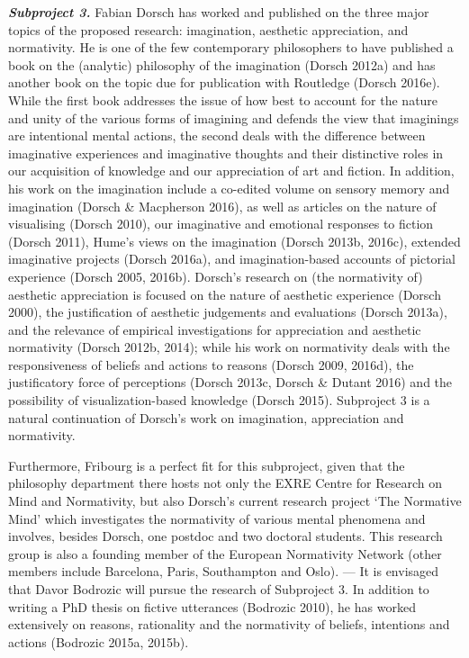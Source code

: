 \vspace{.2cm}
\noindent \textbf{\emph{Subproject 3.}} Fabian Dorsch has worked and published on the three major topics of the proposed research: imagination, aesthetic appreciation, and normativity. He is one of the few contemporary philosophers to have published a book on the (analytic) philosophy of the imagination (Dorsch 2012a) and has another book on the topic due for publication with Routledge (Dorsch 2016e). While the first book addresses the issue of how best to account for the nature and unity of the various forms of imagining and defends the view that imaginings are intentional mental actions, the second deals with the difference between imaginative experiences and imaginative thoughts and their distinctive roles in our acquisition of knowledge and our appreciation of art and fiction. In addition, his work on the imagination include a co-edited volume on sensory memory and imagination (Dorsch \& Macpherson 2016), as well as articles on the nature of visualising (Dorsch 2010), our imaginative and emotional responses to fiction (Dorsch 2011), Hume's views on the imagination (Dorsch 2013b, 2016c), extended imaginative projects (Dorsch 2016a), and imagination-based accounts of pictorial experience (Dorsch 2005, 2016b). Dorsch's research on (the normativity of) aesthetic appreciation is focused on the nature of aesthetic experience (Dorsch 2000), the justification of aesthetic judgements and evaluations (Dorsch 2013a), and the relevance of empirical investigations for appreciation and aesthetic normativity (Dorsch 2012b, 2014); while his work on normativity deals with the responsiveness of beliefs and actions to reasons (Dorsch 2009, 2016d), the justificatory force of perceptions (Dorsch 2013c, Dorsch \& Dutant 2016) and the possibility of visualization-based knowledge (Dorsch 2015). Subproject 3 is a natural continuation of Dorsch's work on imagination, appreciation and normativity.

Furthermore, Fribourg is a perfect fit for this subproject, given that the philosophy department there hosts not only the EXRE Centre for Research on Mind and Normativity, but also Dorsch's current research project `The Normative Mind' which investigates the normativity of various mental phenomena and involves, besides Dorsch, one postdoc and two doctoral students. This research group is also a founding member of the European Normativity Network (other members include Barcelona, Paris, Southampton and Oslo). --- It is envisaged that Davor Bodrozic will pursue the research of Subproject 3. In addition to writing a PhD thesis on fictive utterances (Bodrozic 2010), he has worked extensively on reasons, rationality and the normativity of beliefs, intentions and actions (Bodrozic 2015a, 2015b). 
